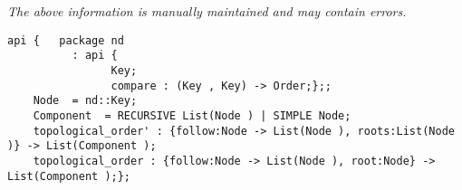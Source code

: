 \label{api:Digraph\_Strongly\_Connected\_Components}

{\tiny \it The above information is manually maintained and may contain errors.}
\begin{verbatim}
api {   package nd
          : api {
                Key;
                compare : (Key , Key) -> Order;};;
    Node  = nd::Key;
    Component  = RECURSIVE List(Node ) | SIMPLE Node;
    topological_order' : {follow:Node -> List(Node ), roots:List(Node )} -> List(Component );
    topological_order : {follow:Node -> List(Node ), root:Node} -> List(Component );};
\end{verbatim}
